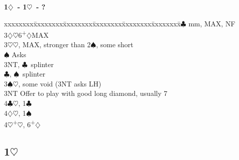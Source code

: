 \documentclass[10pt]{article}
\renewcommand{\c}{$\clubsuit$}
\renewcommand{\d}{$\diamondsuit$}
\newcommand{\h}{$\heartsuit$}
\newcommand{\s}{$\spadesuit$}
\newcommand{\p}{\textsuperscript{+}}
\newcommand{\m}{\textsuperscript{\textminus}}
\newcommand{\x}{DBL}
\newenvironment{bidtable}[1][]
{\textbf{#1}
  \begin{adjustwidth}{1em}{}
    \addvspace{2pt}
    \begin{tabbing}
      xxxxxxxx\=xxxxxxxx\=xxxxxxxx\=xxxxxxxx\=xxxxxxxx\=xxxxxxxx\=\kill}
{\end{tabbing}\end{adjustwidth}\bigskip}%
\newcommand{\pdfh}{\texorpdfstring{\h{}}{H}}
\begin{document}
\begin{multicols*}{2}
\begin{bidtable}[1\d\ - 1\h\ - ?]
3\c             {} mm, MAX, NF                                  \\
3\d             {}\m\h 6\p\d MAX                                 \\
3\h             {}\h, MAX, stronger than 2\s, some short         \\
                \s  \> Asks                                    \\
                \>      \> 3NT, \c\ splinter                       \\
                \>      \c, \s\ splinter                       \\
3\s             {}\h, some void (3NT asks LH)                    \\
3NT             \> Offer to play with good long diamond, usually 7 \\
4\c             {}\h, 1\c                                        \\
4\d             {}\h, 1\s                                        \\
4\h             {}\p\h, 6\p\d                                    \\
\end{bidtable}

\newpage
\subsection{1\pdfh}


\end{multicols*}
\end{document}
